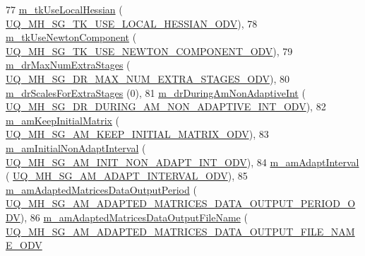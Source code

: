 \begin{DoxyCode}
77   \hyperlink{class_q_u_e_s_o_1_1_mh_options_values_a3fa3d465b07ea276e7b2aa68b897e4ec}{m\_tkUseLocalHessian}                        (
      \hyperlink{_metropolis_hastings_s_g_options_8h_a1f8c00c4abc85b13ac99aa8589ddb63b}{UQ\_MH\_SG\_TK\_USE\_LOCAL\_HESSIAN\_ODV}),
78   \hyperlink{class_q_u_e_s_o_1_1_mh_options_values_ae4fcf242f3d9e216c17d057faf6939c3}{m\_tkUseNewtonComponent}                     (
      \hyperlink{_metropolis_hastings_s_g_options_8h_a53227a25ea286a43bf1079990e6660a6}{UQ\_MH\_SG\_TK\_USE\_NEWTON\_COMPONENT\_ODV}),
79   \hyperlink{class_q_u_e_s_o_1_1_mh_options_values_ab72acd4e4b80dd5c3a4b361466474f21}{m\_drMaxNumExtraStages}                      (
      \hyperlink{_metropolis_hastings_s_g_options_8h_a25f2d316e9719add171ab659591132a3}{UQ\_MH\_SG\_DR\_MAX\_NUM\_EXTRA\_STAGES\_ODV}),
80   \hyperlink{class_q_u_e_s_o_1_1_mh_options_values_a37774da61eda0aaa92dbcc417944b2e2}{m\_drScalesForExtraStages}                   (0),
81   \hyperlink{class_q_u_e_s_o_1_1_mh_options_values_ab546a17967c0690d0c01730f63ccb70b}{m\_drDuringAmNonAdaptiveInt}                 (
      \hyperlink{_metropolis_hastings_s_g_options_8h_ab1c7c652caf08c08976fb716c0747136}{UQ\_MH\_SG\_DR\_DURING\_AM\_NON\_ADAPTIVE\_INT\_ODV}),
82   \hyperlink{class_q_u_e_s_o_1_1_mh_options_values_a65b54138ec13a04d67a75a03f6300132}{m\_amKeepInitialMatrix}                      (
      \hyperlink{_metropolis_hastings_s_g_options_8h_a93d3172ebce0a72149c644a87dd9af85}{UQ\_MH\_SG\_AM\_KEEP\_INITIAL\_MATRIX\_ODV}),
83   \hyperlink{class_q_u_e_s_o_1_1_mh_options_values_a3e72af53780ce9420c3454b00f56bc11}{m\_amInitialNonAdaptInterval}                (
      \hyperlink{_metropolis_hastings_s_g_options_8h_a21720d090f4803e013d42708851c436c}{UQ\_MH\_SG\_AM\_INIT\_NON\_ADAPT\_INT\_ODV}),
84   \hyperlink{class_q_u_e_s_o_1_1_mh_options_values_a5cda43f7f5361c56eab4c036c9bcab5d}{m\_amAdaptInterval}                          (
      \hyperlink{_metropolis_hastings_s_g_options_8h_a77c8418223e86f075851bf910a36f91a}{UQ\_MH\_SG\_AM\_ADAPT\_INTERVAL\_ODV}),
85   \hyperlink{class_q_u_e_s_o_1_1_mh_options_values_a9e9de50014cce9683774d42119a1b752}{m\_amAdaptedMatricesDataOutputPeriod}        (
      \hyperlink{_metropolis_hastings_s_g_options_8h_a31b066c43b9db7ca162b06a0d57d9c0b}{UQ\_MH\_SG\_AM\_ADAPTED\_MATRICES\_DATA\_OUTPUT\_PERIOD\_ODV}),
86   \hyperlink{class_q_u_e_s_o_1_1_mh_options_values_ad131a1b5617e040b7602fbd6bf4a600e}{m\_amAdaptedMatricesDataOutputFileName}      (
      \hyperlink{_metropolis_hastings_s_g_options_8h_ac2b0e9a33eb3be7bd6fd8111d8b986b5}{UQ\_MH\_SG\_AM\_ADAPTED\_MATRICES\_DATA\_OUTPUT\_FILE\_NAME\_ODV}

\end{DoxyCode}
